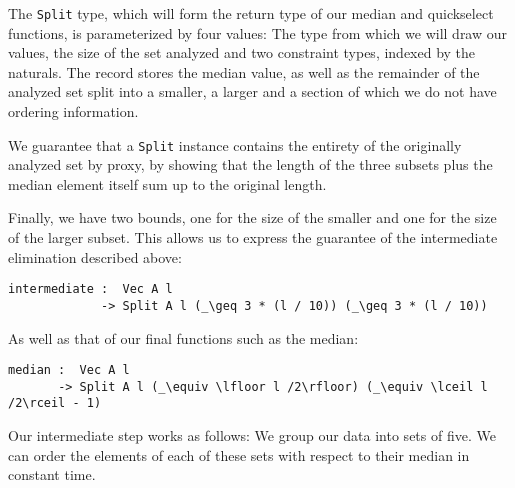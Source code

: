 The \texttt{Split} type, which will form the return type of our median and quickselect functions, is parameterized by four values: The type from which we will draw our values, the size of the set analyzed and two constraint types, indexed by the naturals. The record stores the median value, as well as the remainder of the analyzed set split into a smaller, a larger and a section of which we do not have ordering information.

We guarantee that a \texttt{Split} instance contains the entirety of the originally analyzed set by proxy, by showing that the length of the three subsets plus the median element itself sum up to the original length.

Finally, we have two bounds, one for the size of the smaller and one for the size of the larger subset. This allows us to express the guarantee of the intermediate elimination described above:

\begin{lstlisting}
intermediate :  Vec A l
             -> Split A l (_\geq 3 * (l / 10)) (_\geq 3 * (l / 10))
\end{lstlisting}

As well as that of our final functions such as the median:

\begin{lstlisting}
median :  Vec A l
       -> Split A l (_\equiv \lfloor l /2\rfloor) (_\equiv \lceil l /2\rceil - 1)
\end{lstlisting}


Our intermediate step works as follows: We group our data into sets of five. We can order the elements of each of these sets with respect to their median in constant time.

